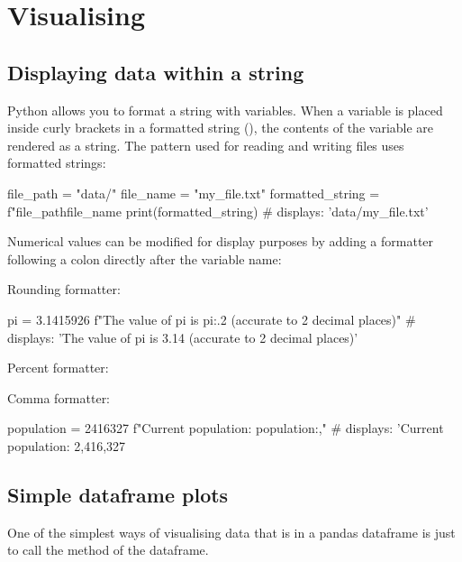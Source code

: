 \chapter{Visualising}
\label{chapter:visualising}

\section{Displaying data within a string}

Python allows you to format a string with variables. When a variable is placed inside curly brackets \code{{}} in a formatted string (), the contents of the variable are rendered as a string. The pattern used for reading and writing files uses formatted strings:

\begin{pycode}
    file_path = "data/"
    file_name = "my_file.txt"
    formatted_string = f"{file_path}{file_name}
    print(formatted_string)
    # displays: 'data/my_file.txt'
\end{pycode}

Numerical values can be modified for display purposes by adding a formatter following a colon directly after the variable name:

Rounding formatter:

\begin{pycode}
    pi = 3.1415926
    f"The value of pi is {pi:.2} (accurate to 2 decimal places)"
    # displays: 'The value of pi is 3.14 (accurate to 2 decimal places)'
\end{pycode}

Percent formatter:


Comma formatter:

\begin{pycode}
    population = 2416327
    f"Current population: {population:,}"
    # displays: 'Current population: 2,416,327
\end{pycode}

\section{Simple dataframe plots}

One of the simplest ways of visualising data that is in a pandas dataframe is just to call the  method of the dataframe.

